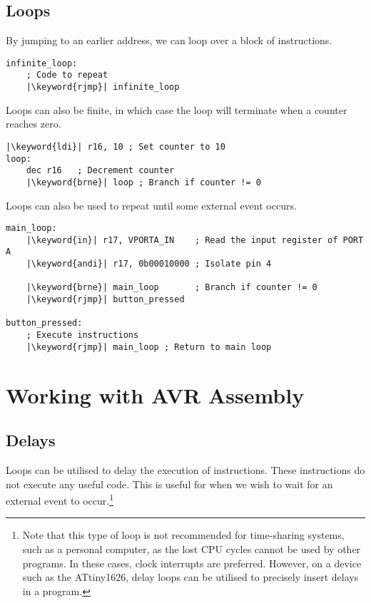 \documentclass{article}
\newcommand{\keyword}[1]{\textcolor[rgb]{0.00,0.50,0.00}{\textbf{#1}}}
\begin{document}
\subsection{Loops}
By jumping to an earlier address, we can loop over a block of
instructions.
\begin{verbatim}
infinite_loop:
    ; Code to repeat
    |\keyword{rjmp}| infinite_loop
\end{verbatim}
Loops can also be finite, in which case the loop will terminate when a
counter reaches zero.
\begin{verbatim}
|\keyword{ldi}| r16, 10 ; Set counter to 10
loop:
    dec r16   ; Decrement counter
    |\keyword{brne}| loop ; Branch if counter != 0
\end{verbatim}
Loops can also be used to repeat until some external event occurs.
\begin{verbatim}
main_loop:
    |\keyword{in}| r17, VPORTA_IN    ; Read the input register of PORT A
    |\keyword{andi}| r17, 0b00010000 ; Isolate pin 4

    |\keyword{brne}| main_loop       ; Branch if counter != 0
    |\keyword{rjmp}| button_pressed

button_pressed:
    ; Execute instructions
    |\keyword{rjmp}| main_loop ; Return to main loop
\end{verbatim}
\section{Working with AVR Assembly}
\subsection{Delays}
Loops can be utilised to delay the execution of instructions. These
instructions do not execute any useful code. This is useful for when we
wish to wait for an external event to occur.\footnote{Note that this
type of loop is not recommended for time-sharing systems, such as a
personal computer, as the lost CPU cycles cannot be used by other
programs. In these cases, clock interrupts are preferred. However, on a
device such as the ATtiny1626, delay loops can be utilised to precisely
insert delays in a program.}
\end{document}

